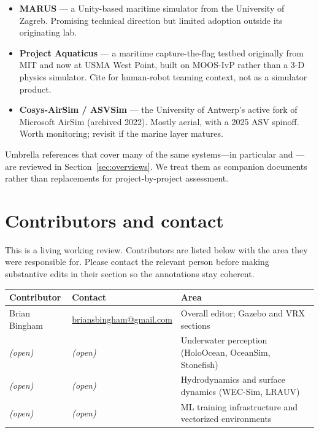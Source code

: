 \documentclass[11pt]{article}
\begin{document}
\begin{itemize}[leftmargin=*]
  \item \textbf{MARUS} \autocite{loncar2022marus} --- a Unity-based maritime simulator from the University of Zagreb. Promising technical direction but limited adoption outside its originating lab.
  \item \textbf{Project Aquaticus} \autocite{novitzky2024aquaticus} --- a maritime capture-the-flag testbed originally from MIT and now at USMA West Point, built on MOOS-IvP rather than a 3-D physics simulator. Cite for human-robot teaming context, not as a simulator product.
  \item \textbf{Cosys-AirSim / ASVSim} \autocite{jansen2023cosysairsim,vanmiddelaar2025asvsim} --- the University of Antwerp's active fork of Microsoft AirSim (archived 2022). Mostly aerial, with a 2025 ASV spinoff. Worth monitoring; revisit if the marine layer matures.
\end{itemize}

Umbrella references that cover many of the same systems---in particular \textcite{aldhaheri2025ursreview} and \textcite{sim2026marinesim}---are reviewed in Section~\ref{sec:overviews}. We treat them as companion documents rather than replacements for project-by-project assessment.

\section{Contributors and contact}
\label{sec:contributors}

This is a living working review. Contributors are listed below with the area they were responsible for. Please contact the relevant person before making substantive edits in their section so the annotations stay coherent.

\begin{center}
\begin{tabular}{@{}>{\raggedright\arraybackslash}p{} >{\raggedright\arraybackslash}p{} >{\raggedright\arraybackslash}p{}@{}}
\toprule
\textbf{Contributor} & \textbf{Contact} & \textbf{Area} \\
\midrule
Brian Bingham & \href{mailto:briansbingham@gmail.com}{briansbingham@gmail.com} & Overall editor; Gazebo and VRX sections \\
\addlinespace
\textit{(open)} & \textit{(open)} & Underwater perception (HoloOcean, OceanSim, Stonefish) \\
\addlinespace
\textit{(open)} & \textit{(open)} & Hydrodynamics and surface dynamics (WEC-Sim, LRAUV) \\
\addlinespace
\textit{(open)} & \textit{(open)} & ML training infrastructure and vectorized environments \\
\bottomrule
\end{tabular}
\end{center}

\printbibliography[heading=bibintoc,title={Annotated references}]
\end{document}
